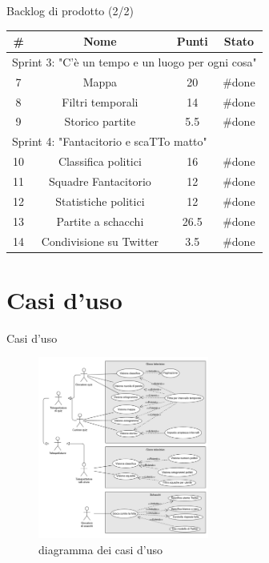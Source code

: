 \documentclass{beamer}
\begin{document}
\begin{frame}{Backlog di prodotto (2/2)}
	\begin{table}
		\begin{tabular}{|c|c|c|c|}
			\hline
			\textbf{\#} & \textbf{Nome}           & \textbf{Punti} & \textbf{Stato} \\
			\hline
			\multicolumn{4}{|l|}{Sprint 3: "C'è un tempo e un luogo per ogni cosa"} \\
			\hline
			7           & Mappa                   & 20             & \#done         \\
			\hline
			8           & Filtri temporali        & 14             & \#done         \\
			\hline
			9           & Storico partite         & 5.5            & \#done         \\
			\hline
			\multicolumn{4}{|l|}{Sprint 4: "Fantacitorio e scaTTo matto"}           \\
			\hline
			10          & Classifica politici     & 16             & \#done         \\
			\hline
			11          & Squadre Fantacitorio    & 12             & \#done         \\
			\hline
			12          & Statistiche politici    & 12             & \#done         \\
			\hline
			13          & Partite a schacchi      & 26.5           & \#done         \\
			\hline
			14          & Condivisione su Twitter & 3.5            & \#done         \\
			\hline
		\end{tabular}
	\end{table}
\end{frame}

\section{Casi d'uso}
\begin{frame}{Casi d'uso}
	\begin{figure}
		\includegraphics[width=0.5\textwidth]{use-cases}
		\caption{diagramma dei casi d'uso}
	\end{figure}
\end{frame}
\end{document}

